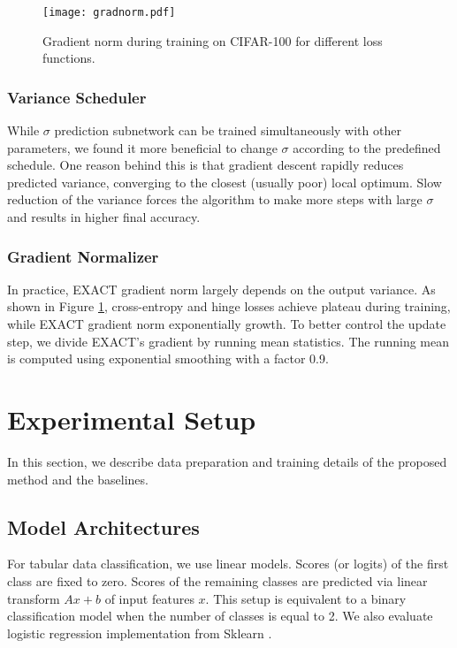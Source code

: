 \documentclass[nohyperref]{article}
\theoremstyle{plain}
\theoremstyle{definition}
\theoremstyle{remark}
\begin{document}
\begin{figure}[t]
\vskip 0.0in
\centering
\texttt{[image: gradnorm.pdf]}
\caption{Gradient norm during training on CIFAR-100 for different loss functions.}
\label{fig:gradnorm}
\vskip -0.2in
\end{figure}

\subsubsection{Variance Scheduler}
While $\sigma$ prediction subnetwork can be trained simultaneously with other parameters, we found it more beneficial to change $\sigma$ according to the predefined schedule. One reason behind this is that gradient descent rapidly reduces predicted variance, converging to the closest (usually poor) local optimum. Slow reduction of the variance forces the algorithm to make more steps with large $\sigma$ and results in higher final accuracy.

\subsubsection{Gradient Normalizer}
In practice, EXACT gradient norm largely depends on the output variance. As shown in Figure \ref{fig:gradnorm}, cross-entropy and hinge losses achieve plateau during training, while EXACT gradient norm exponentially growth. To better control the update step, we divide EXACT's gradient by running mean statistics. The running mean is computed using exponential smoothing with a factor 0.9.







\section{Experimental Setup}
In this section, we describe data preparation and training details of the proposed method and the baselines.

\subsection{Model Architectures}
For tabular data classification, we use linear models. Scores (or logits) of the first class are fixed to zero. Scores of the remaining classes are predicted via linear transform \mbox{$Ax + b$} of input features $x$. This setup is equivalent to a binary classification model when the number of classes is equal to 2. We also evaluate logistic regression implementation from Sklearn \cite{scikit-learn}.
\end{document}
